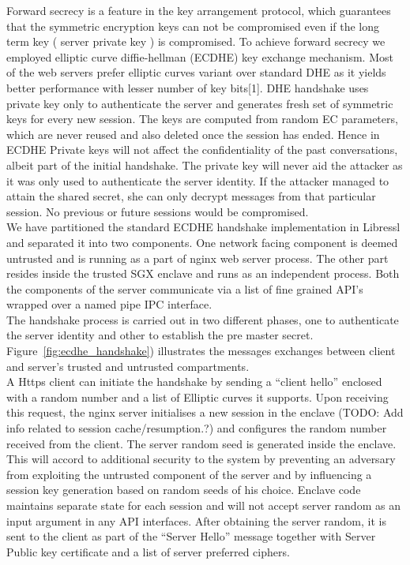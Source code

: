 \documentclass[../../main.tex]{subfiles}
\begin{document}
Forward secrecy is a feature in the key arrangement protocol, which
guarantees that the symmetric encryption keys can not be compromised
even if the long term key ( server private key ) is compromised. To
achieve forward secrecy we employed elliptic curve
diffie-hellman (ECDHE) key exchange mechanism. Most of the web
servers prefer elliptic curves variant over standard DHE as it yields
better performance with lesser number of key bits[1]. DHE handshake
uses private key only to authenticate the server and generates fresh
set of symmetric keys for every new session. The keys are computed
from random EC parameters, which are never reused and also deleted
once the session has ended. Hence in ECDHE Private keys will not
affect the confidentiality of the past conversations, albeit part of
the initial handshake. The private key will never aid the attacker as
it was only used to authenticate the server identity. If the attacker
managed to attain the shared secret, she can only decrypt messages
from that particular session. No previous or future sessions would be
compromised.\\

\noindent
We have partitioned the standard ECDHE handshake implementation in
Libressl and separated it into two components. One network facing
component is deemed untrusted and is running as a part of nginx web
server process. The other part resides inside the trusted SGX enclave
and runs as an independent process. Both the components of the server
communicate via a list of fine grained API’s
wrapped over a named pipe IPC interface.\\

\noindent
The handshake process is carried out in two different phases, one to
authenticate the server identity and other to establish the pre master
secret. Figure~\ref{fig:ecdhe_handshake}) illustrates the messages
exchanges between client and server’s trusted and untrusted compartments.\\

\noindent
A Https client can initiate the handshake by sending a “client hello”
enclosed with a random number and a list of Elliptic curves it
supports. Upon receiving this request, the nginx server initialises a
new session in the enclave (TODO: Add info related to session
cache/resumption.?) and configures the random number received from the
client. The server random seed is generated inside the enclave. This
will accord to additional security to the system by preventing an
adversary from exploiting the untrusted component of the server and by
influencing a session key generation based on random seeds of his
choice. Enclave code maintains separate state for each session and
will not accept server random as an input argument in any API
interfaces. After obtaining the server random, it is sent to the
client as part of the “Server Hello” message together with Server
Public key certificate and a list of server preferred ciphers.
\end{document}
